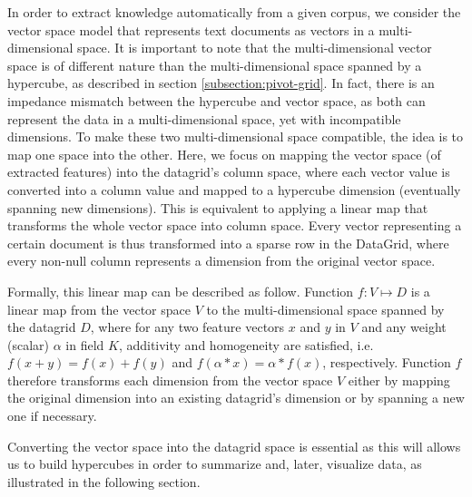 \documentclass[10pt, a4paper, twocolumn]{article} %
\begin{document}
In order to extract knowledge automatically from a given corpus, we consider the vector space model that represents text documents as vectors in a multi-dimensional space.
It is important to note that the multi-dimensional vector space is of different nature than the multi-dimensional space spanned by a hypercube, as described in section \ref{subsection:pivot-grid}.
In fact, there is an impedance mismatch between the hypercube and vector space, as both can represent the data in a multi-dimensional space, yet with incompatible dimensions.
To make these two multi-dimensional space compatible, the idea is to map one space into the other. Here, we focus on mapping the vector space (of extracted features) into the datagrid's column space, where each vector value is converted into a column value and mapped to a hypercube dimension (eventually spanning new dimensions). This is equivalent to applying a linear map that transforms the whole vector space into column space.
Every vector representing a certain document is thus transformed into a sparse row in the DataGrid, where every non-null column represents a dimension from the original vector space.

Formally, this linear map can be described as follow.
Function $f : V \mapsto D$ is a linear map from the vector space $V$ to the multi-dimensional space spanned by the datagrid $D$, where for any two feature vectors $x$ and $y$ in $V$ and any weight (scalar) $\alpha$ in field $K$, additivity and homogeneity are satisfied, i.e. $f(x+y)=f(x)+f(y)$ and $f(\alpha * x) = \alpha * f(x)$, respectively.
Function $f$ therefore transforms each dimension from the vector space $V$ either by mapping the original dimension into an existing datagrid's dimension or by spanning a new one if necessary.




Converting the vector space into the datagrid space is essential as this will allows us to build hypercubes in order to summarize and, later, visualize data, as illustrated in the following section.

\end{document}

